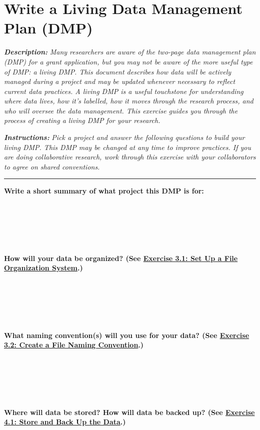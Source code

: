 \documentclass[
]{book}
\begin{document}
\hypertarget{living-dmp}{%
\section{Write a Living Data Management Plan (DMP)}\label{living-dmp}}

\textbf{\emph{Description:}} \emph{Many researchers are aware of the two-page data management plan (DMP) for a grant application, but you may not be aware of the more useful type of DMP: a living DMP. This document describes how data will be actively managed during a project and may be updated whenever necessary to reflect current data practices. A living DMP is a useful touchstone for understanding where data lives, how it's labelled, how it moves through the research process, and who will oversee the data management. This exercise guides you through the process of creating a living DMP for your research.}

\textbf{\emph{Instructions:}} \emph{Pick a project and answer the following questions to build your living DMP. This DMP may be changed at any time to improve practices. If you are doing collaborative research, work through this exercise with your collaborators to agree on shared conventions.}

\begin{center}\rule{0.5\linewidth}{0.5pt}\end{center}

\textbf{Write a short summary of what project this DMP is for:}

~

~

~

\textbf{How will your data be organized? (See \protect\hyperlink{file-organization}{Exercise 3.1: Set Up a File Organization System}.)}

~

~

~

\textbf{What naming convention(s) will you use for your data? (See \protect\hyperlink{file-naming}{Exercise 3.2: Create a File Naming Convention}.)}

~

~

~

\textbf{Where will data be stored? How will data be backed up? (See \protect\hyperlink{storage}{Exercise 4.1: Store and Back Up the Data}.)}

~

~

~
\end{document}
